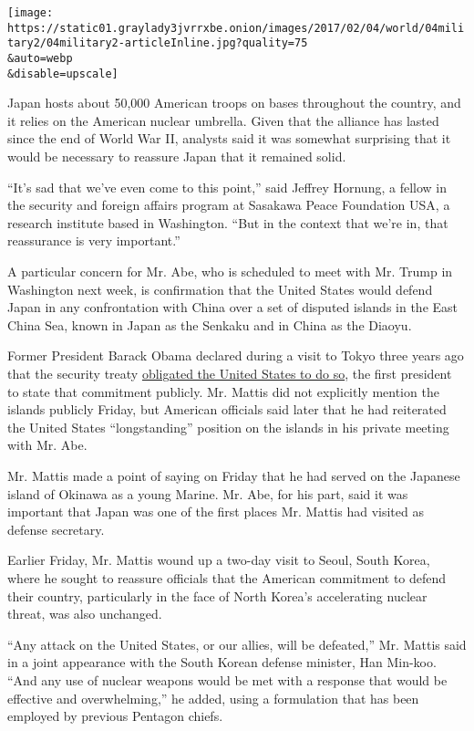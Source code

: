 \texttt{[image: https://static01.graylady3jvrrxbe.onion/images/2017/02/04/world/04military2/04military2-articleInline.jpg?quality=75\\\&auto=webp\\\&disable=upscale]}

Japan hosts about 50,000 American troops on bases throughout the
country, and it relies on the American nuclear umbrella. Given that the
alliance has lasted since the end of World War II, analysts said it was
somewhat surprising that it would be necessary to reassure Japan that it
remained solid.

``It's sad that we've even come to this point,'' said Jeffrey Hornung, a
fellow in the security and foreign affairs program at Sasakawa Peace
Foundation USA, a research institute based in Washington. ``But in the
context that we're in, that reassurance is very important.''

A particular concern for Mr. Abe, who is scheduled to meet with Mr.
Trump in Washington next week, is confirmation that the United States
would defend Japan in any confrontation with China over a set of
disputed islands in the East China Sea, known in Japan as the Senkaku
and in China as the Diaoyu.

Former President Barack Obama declared during a visit to Tokyo three
years ago that the security treaty
\href{https://www.nytimes3xbfgragh.onion/2014/04/25/world/asia/obama-asia.html}{obligated
the United States to do so}, the first president to state that
commitment publicly. Mr. Mattis did not explicitly mention the islands
publicly Friday, but American officials said later that he had
reiterated the United States ``longstanding'' position on the islands in
his private meeting with Mr. Abe.

Mr. Mattis made a point of saying on Friday that he had served on the
Japanese island of Okinawa as a young Marine. Mr. Abe, for his part,
said it was important that Japan was one of the first places Mr. Mattis
had visited as defense secretary.

Earlier Friday, Mr. Mattis wound up a two-day visit to Seoul, South
Korea, where he sought to reassure officials that the American
commitment to defend their country, particularly in the face of North
Korea's accelerating nuclear threat, was also unchanged.

``Any attack on the United States, or our allies, will be defeated,''
Mr. Mattis said in a joint appearance with the South Korean defense
minister, Han Min-koo. ``And any use of nuclear weapons would be met
with a response that would be effective and overwhelming,'' he added,
using a formulation that has been employed by previous Pentagon chiefs.

